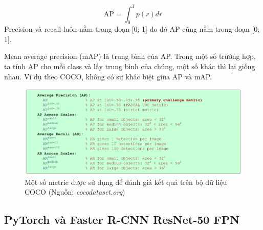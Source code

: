 \documentclass[a4paper, 12pt]{report}
\begin{document}
$$ \text{AP} = \int_{0}^{1}p(r)dr$$
Precision và recall luôn nằm trong đoạn [0; 1] do đó AP cũng nằm trong đoạn [0; 1].  \par
Mean average precision (mAP) là trung bình của AP. Trong một số trường hợp, ta tính AP cho mỗi class và lấy trung bình của chúng, một số khác thì lại giống nhau. Ví dụ theo COCO, không có sự khác biệt giữa AP và mAP.\par
\begin{figure}[!h]
	\centering
	\includegraphics[width=1\linewidth]{Images/cocometric}
	\caption{Một số metric được sử dụng để đánh giá kết quả trên bộ dữ liệu COCO (Nguồn: \textit{cocodataset.org})}
	\label{fig:cocometric}
\end{figure}

\subsection{PyTorch và Faster R-CNN ResNet-50 FPN}
\end{document}
